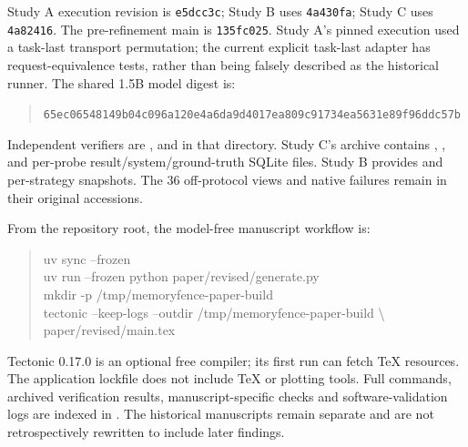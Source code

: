 \documentclass[10pt,letterpaper]{article}
\begin{document}
Study A execution revision is \texttt{e5dcc3c}; Study B uses \texttt{4a430fa}; Study C uses \texttt{4a82416}. The pre-refinement main is \texttt{135fc025}. Study A's pinned execution used a task-last transport permutation; the current explicit task-last adapter has request-equivalence tests, rather than being falsely described as the historical runner. The shared 1.5B model digest is:
\begin{quote}\footnotesize
\texttt{65ec06548149b04c}\allowbreak\texttt{096a120e4a6da9d4}\allowbreak\texttt{017ea809c91734ea}\allowbreak\texttt{5631e89f96ddc57b}
\end{quote}

Independent verifiers are ,  and  in that directory. Study C's archive contains , ,  and per-probe result/system/ground-truth SQLite files. Study B provides  and per-strategy snapshots. The 36 off-protocol views and native failures remain in their original accessions.

From the repository root, the model-free manuscript workflow is:
\begin{quote}\small\ttfamily
uv sync --frozen\\
uv run --frozen python paper/revised/generate.py\\
mkdir -p /tmp/memoryfence-paper-build\\
tectonic --keep-logs --outdir /tmp/memoryfence-paper-build \textbackslash{}\\
\hspace*{1em}paper/revised/main.tex
\end{quote}
Tectonic 0.17.0 is an optional free compiler; its first run can fetch TeX resources. The application lockfile does not include TeX or plotting tools. Full commands, archived verification results, manuscript-specific checks and software-validation logs are indexed in . The historical manuscripts remain separate and are not retrospectively rewritten to include later findings.
\end{document}
